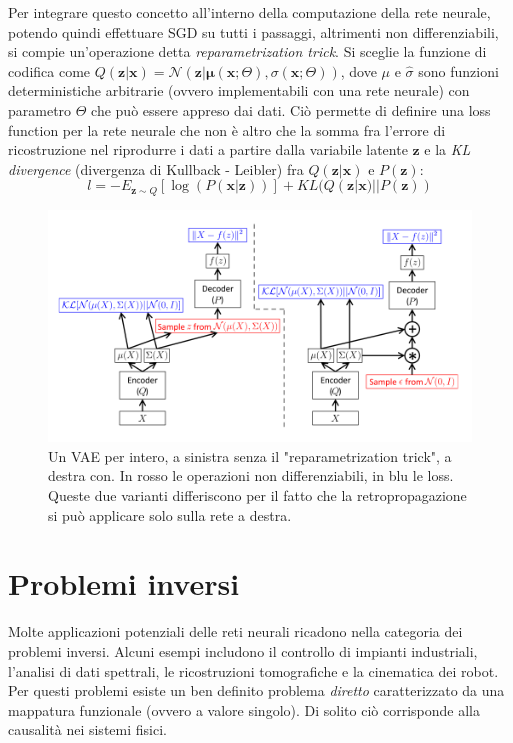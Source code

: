 Per integrare questo concetto all'interno della computazione della rete neurale, potendo quindi effettuare SGD su tutti i passaggi, altrimenti non differenziabili, si compie un'operazione detta \textit{reparametrization trick}. Si sceglie la funzione di codifica come $Q(\boldsymbol{z} | \boldsymbol{x}) = \mathcal{N}(\boldsymbol{z} | \boldsymbol{\mu}(\boldsymbol{x}; \Theta), \sigma(\boldsymbol{x}; \Theta))$, dove $\mu$ e $\hat\sigma$ sono funzioni deterministiche arbitrarie (ovvero implementabili con una rete neurale) con parametro $\Theta$ che può essere appreso dai dati. Ciò permette di definire una loss function per la rete neurale che non è altro che la somma fra l'errore di ricostruzione nel riprodurre i dati a partire dalla variabile latente $\boldsymbol{z}$ e la \textit{KL divergence} (divergenza di Kullback - Leibler) fra $Q(\boldsymbol{z} | \boldsymbol{x})$ e $P(\boldsymbol{z})$:
\begin{equation}
	\label{vae_loss}
	l = -E_{\boldsymbol{z}\sim Q}[\log(P(\boldsymbol{x} | \boldsymbol{z}))] + KL(Q(\boldsymbol{z} | \boldsymbol{x}) || P(\boldsymbol{z}))
\end{equation}
\begin{figure}[ht]
	\centering
	\includegraphics[width=\textwidth]{img/vae_struct.png}
	\caption{Un VAE per intero, a sinistra senza il "reparametrization trick", a destra con. In rosso le operazioni non differenziabili, in blu le loss. Queste due varianti differiscono per il fatto che la retropropagazione si può applicare solo sulla rete a destra.}
	\label{fig:1.14}
\end{figure}

\section{Problemi inversi} %
\label{sec:problemi_inversi}
Molte applicazioni potenziali delle reti neurali ricadono nella categoria dei problemi inversi. Alcuni esempi includono il controllo di impianti industriali, l'analisi di dati spettrali, le ricostruzioni tomografiche e la cinematica dei robot. Per questi problemi esiste un ben definito problema \textit{diretto} caratterizzato da una mappatura funzionale (ovvero a valore singolo). Di solito ciò corrisponde alla causalità nei sistemi fisici. 

